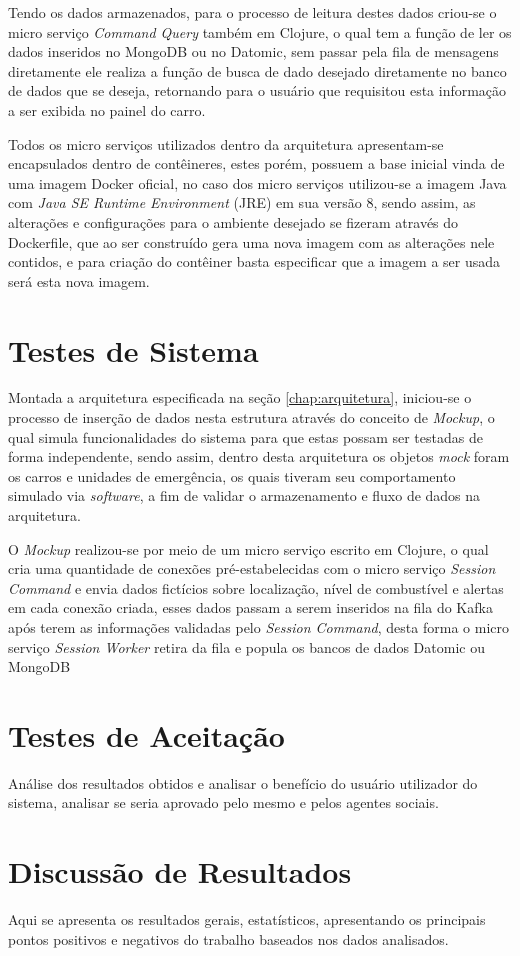 Tendo os dados armazenados, para o processo de leitura destes dados criou-se o micro serviço \textit{Command Query} também em Clojure, o qual tem a função de ler os dados inseridos no MongoDB ou no Datomic, sem passar pela fila de mensagens diretamente ele realiza a função de busca de dado desejado diretamente no banco de dados que se deseja, retornando para o usuário que requisitou esta informação a ser exibida no painel do carro.

Todos os micro serviços  utilizados dentro da arquitetura apresentam-se encapsulados dentro de contêineres, estes porém, possuem a base inicial vinda de uma imagem Docker oficial, no caso dos micro serviços utilizou-se a imagem Java com \textit{Java SE Runtime Environment} (JRE) em sua versão 8, sendo assim, as alterações e configurações para o ambiente desejado se fizeram através do Dockerfile, que ao ser construído gera uma nova imagem com as alterações nele contidos, e para criação do contêiner basta especificar que a imagem a ser usada será esta nova imagem.

\section{Testes de Sistema}
\label{sec:testessistema}
Montada a arquitetura especificada na seção \ref{chap:arquitetura}, iniciou-se o processo de inserção de dados nesta estrutura através do conceito de \textit{Mockup}, o qual simula funcionalidades do sistema para que estas possam ser testadas de forma independente, sendo assim, dentro desta arquitetura os objetos \textit{mock} foram os carros e unidades de emergência, os quais tiveram seu comportamento simulado via \textit{software}, a fim de validar o armazenamento e fluxo de dados na arquitetura.

O \textit{Mockup} realizou-se por meio de um micro serviço escrito em Clojure, o qual cria uma quantidade de conexões pré-estabelecidas com o micro serviço \textit{Session Command} e envia dados fictícios sobre localização, nível de combustível e alertas em cada conexão criada, esses dados passam a serem inseridos na fila do Kafka após terem as informações validadas pelo \textit{Session Command}, desta forma o micro serviço \textit{Session Worker} retira da fila e popula os bancos de dados Datomic ou MongoDB

\section{Testes de Aceitação}
\label{sec:testesaceitacao}
Análise dos resultados obtidos e analisar o benefício do usuário utilizador do sistema, analisar se seria aprovado pelo mesmo e pelos agentes sociais.

\section{Discussão de Resultados}
\label{sec:discussãoresultados}
Aqui se apresenta os resultados gerais, estatísticos, apresentando os principais pontos positivos e negativos do trabalho baseados nos dados analisados.
